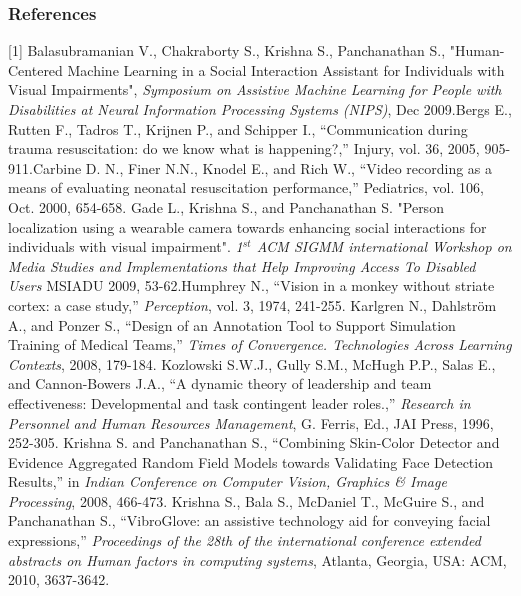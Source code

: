 \documentclass{article} %
\begin{document}
\subsubsection*{References}
\vspace{-0.11in}
\small{
[1] Balasubramanian V., Chakraborty S., Krishna S., Panchanathan S., "Human-Centered Machine Learning in a Social Interaction Assistant for Individuals with Visual Impairments", {\it Symposium on Assistive Machine Learning for People with Disabilities at Neural Information Processing Systems (NIPS)}, Dec 2009.\newline
[2] Bergs E., Rutten F., Tadros T., Krijnen P., and Schipper I., “Communication during trauma resuscitation: do we know what is happening?,” Injury,  vol. 36, 2005, 905-911.\newline
[3] Carbine D. N., Finer N.N., Knodel E., and Rich W., “Video recording as a means of evaluating neonatal resuscitation performance,” Pediatrics,  vol. 106, Oct. 2000,  654-658. \newline
[4] Gade L., Krishna S., and Panchanathan S. "Person localization using a wearable camera towards enhancing social interactions for individuals with visual impairment". {\it 1$^{st}$ ACM SIGMM international Workshop on Media Studies and Implementations that Help Improving Access To Disabled Users} MSIADU 2009, 53-62.\newline
[5] Humphrey N., “Vision in a monkey without striate cortex: a case study,” {\it Perception},  vol. 3, 1974, 241-255. \newline
[6] Karlgren N., Dahlström A., and Ponzer S., “Design of an Annotation Tool to Support Simulation Training of Medical Teams,” {\it Times of Convergence. Technologies Across Learning Contexts}, 2008, 179-184. \newline
[7] Kozlowski S.W.J., Gully S.M., McHugh P.P., Salas E., and Cannon-Bowers J.A., “A dynamic theory of leadership and team effectiveness: Developmental and task contingent leader roles.,” {\it Research in Personnel and Human Resources Management}, G. Ferris, Ed., JAI Press, 1996, 252-305. \newline
[8] Krishna S. and Panchanathan S., “Combining Skin-Color Detector and Evidence Aggregated Random Field Models towards Validating Face Detection Results,” in {\it  Indian Conference on Computer Vision, Graphics \& Image Processing}, 2008, 466-473. \newline
[9] Krishna S., Bala S., McDaniel T., McGuire S., and Panchanathan S., “VibroGlove: an assistive technology aid for conveying facial expressions,” { \it Proceedings of the 28th of the international conference extended abstracts on Human factors in computing systems}, Atlanta, Georgia, USA: ACM, 2010, 3637-3642.\newline
}
\end{document}
